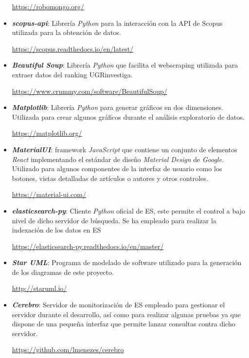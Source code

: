 \begin{itemize}
	\url{https://robomongo.org/}
	
	\item \textbf{\textit{scopus-api}}: Librería \textit{Python} para la interacción con la \acrshort{API} de Scopus utilizada para la obtención de datos.
	
	\url{https://scopus.readthedocs.io/en/latest/}
	
	
	\item \textit{\textbf{Beautiful Soup}}: Librería \textit{Python} que facilita el \gls{webscraping} utilizada para extraer datos del ranking UGRinvestiga.
	
	\url{https://www.crummy.com/software/BeautifulSoup/}
	
	\item \textbf{\textit{Matplotlib}}: Librería \textit{Python} para generar gráficos en dos dimensiones. Utilizada para crear algunos gráficos durante el análisis exploratorio de datos.
	
	\url{https://matplotlib.org/}
	
	\item \textbf{\textit{MaterialUI}}: \Gls{framework} \textit{JavaScript} que contiene un conjunto de elementos \textit{React} implementando el estándar de diseño \textit{Material Design} de \textit{Google}. Utilizado para algunos componentes de la interfaz de usuario como los botones, vistas detalladas de artículos o autores y otros controles.
	
	\url{https://material-ui.com/}
	
	\item \textit{\textbf{elasticsearch-py}}: Cliente \textit{Python} oficial de \acrshort{ES}, este permite el control a bajo nivel de dicho servidor de búsqueda. Se ha empleado para realizar la indexación de los datos en \acrshort{ES}
	
	\url{https://elasticsearch-py.readthedocs.io/en/master/}
	\item \textit{\textbf{Star UML}}: Programa de modelado de software utilizado para la generación de los diagramas de este proyecto.
	
	\url{http://staruml.io/}
	
	\item \textit{\textbf{Cerebro}}: Servidor de monitorización de \acrshort{ES} empleado para gestionar el servidor durante el desarrollo, así como para realizar algunas pruebas ya que dispone de una pequeña interfaz que permite lanzar consultas contra dicho servidor. 
	
	\url{https://github.com/lmenezes/cerebro}
	

\end{itemize}

